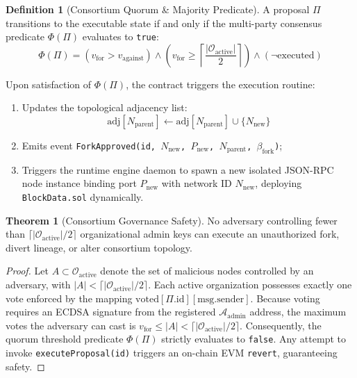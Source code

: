\documentclass[journal]{IEEEtran}
\theoremstyle{definition}
\newtheorem{definition}{Definition}
\newtheorem{theorem}{Theorem}
\begin{document}
\begin{definition}[Consortium Quorum \& Majority Predicate]
A proposal $\Pi$ transitions to the executable state if and only if the multi-party consensus predicate $\Phi(\Pi)$ evaluates to \texttt{true}:
\begin{equation}
\Phi(\Pi) = \left( v_{\text{for}} > v_{\text{against}} \right) \land \left( v_{\text{for}} \ge \left\lceil \frac{|\mathcal{O}_{\text{active}}|}{2} \right\rceil \right) \land (\neg \text{executed})
\end{equation}
\end{definition}

Upon satisfaction of $\Phi(\Pi)$, the contract triggers the execution routine:
\begin{enumerate}
    \item Updates the topological adjacency list:
    \begin{equation}
    \text{adj}[N_{\text{parent}}] \leftarrow \text{adj}[N_{\text{parent}}] \cup \{N_{\text{new}}\}
    \end{equation}
    \item Emits event \texttt{ForkApproved(id, $N_{\text{new}}$, $P_{\text{new}}$, $N_{\text{parent}}$, $\beta_{\text{fork}}$)};
    \item Triggers the runtime engine daemon to spawn a new isolated JSON-RPC node instance binding port $P_{\text{new}}$ with network ID $N_{\text{new}}$, deploying \texttt{BlockData.sol} dynamically.
\end{enumerate}

\begin{theorem}[Consortium Governance Safety]
\label{thm:gov_safety}
No adversary controlling fewer than $\lceil |\mathcal{O}_{\text{active}}| / 2 \rceil$ organizational admin keys can execute an unauthorized fork, divert lineage, or alter consortium topology.
\end{theorem}

\begin{proof}
Let $A \subset \mathcal{O}_{\text{active}}$ denote the set of malicious nodes controlled by an adversary, with $|A| < \lceil |\mathcal{O}_{\text{active}}| / 2 \rceil$. Each active organization possesses exactly one vote enforced by the mapping $\text{voted}[\Pi.\text{id}][\text{msg.sender}]$. Because voting requires an ECDSA signature from the registered $\mathcal{A}_{\text{admin}}$ address, the maximum votes the adversary can cast is $v_{\text{for}} \le |A| < \lceil |\mathcal{O}_{\text{active}}| / 2 \rceil$. Consequently, the quorum threshold predicate $\Phi(\Pi)$ strictly evaluates to \texttt{false}. Any attempt to invoke \texttt{executeProposal(id)} triggers an on-chain EVM \texttt{revert}, guaranteeing safety.
\end{proof}
\end{document}
